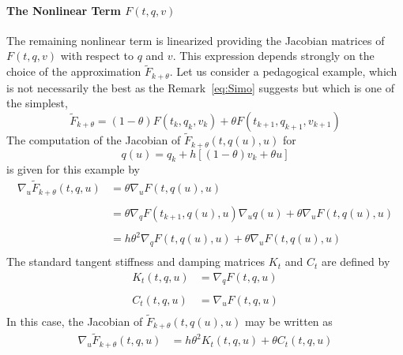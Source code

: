 

\paragraph{The Nonlinear Term $F(t,q,v)$}
The remaining nonlinear term is  linearized providing the Jacobian matrices of $F(t,q,v)$ with respect to $q$ and $v$. This expression depends strongly on the choice of the approximation $\tilde F_{k+\theta}$. Let us consider a pedagogical example, which is not necessarily the best as the Remark~\ref{eq:Simo} suggests but which is one of the simplest,
\begin{equation}
  \label{eq:NL13}
  \tilde F_{k+\theta} = (1-\theta) F(t_k,q_k,v_k) + \theta F(t_{k+1},q_{k+1},v_{k+1})
\end{equation}
The computation of the Jacobian of $  \tilde F_{k+\theta}(t,q(u),u)$ for $$q(u) = q_k+h[(1-\theta)v_k+\theta u]   $$ is given for this example by
\begin{equation}
  \label{eq:NL12}
  \begin{array}{ll}
    \nabla_u  \tilde F_{k+\theta}(t,q,u) &= \theta \nabla_u  F(t,q(u),u) \\ \\
    &= \theta \nabla_q F(t_{k+1},q(u)   ,u) \nabla_{u} q(u) + \theta \nabla_{u} F(t,q(u),u)    \\ \\
    &= h \theta^2 \nabla_q F(t, q(u)   ,u) + \theta \nabla_{u} F(t,q(u),u) \\
  \end{array}
\end{equation}
The standard tangent stiffness and damping matrices $K_t$ and $C_t$ are defined by
\begin{equation}
  \label{eq:NL14}
  \begin{array}{ll}
  K_t(t,q,u) &= \nabla_q F(t, q   ,u) \\ \\
  C_t(t,q,u) &= \nabla_u F(t, q   ,u) \\
\end{array}
\end{equation}
In this case, the  Jacobian of $  \tilde F_{k+\theta}(t,q(u),u)$ may be written as
\begin{equation}
  \label{eq:NL15}
  \begin{array}{ll}
    \nabla_u  \tilde F_{k+\theta}(t,q,u) &=  h \theta^2  K_t(t,q,u) + \theta C_t(t, q   ,u)  \\
  \end{array}
\end{equation}

